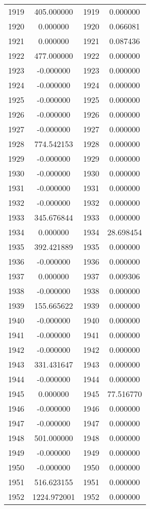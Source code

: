 \documentclass[12pt]{article}
\begin{document}
\begin{longtable}{@{}cccc@{}}
1919 & 405.000000 & 1919 & 0.000000 \\
1920 & 0.000000 & 1920 & 0.066081 \\
1921 & 0.000000 & 1921 & 0.087436 \\
1922 & 477.000000 & 1922 & 0.000000 \\
1923 & -0.000000 & 1923 & 0.000000 \\
1924 & -0.000000 & 1924 & 0.000000 \\
1925 & -0.000000 & 1925 & 0.000000 \\
1926 & -0.000000 & 1926 & 0.000000 \\
1927 & -0.000000 & 1927 & 0.000000 \\
1928 & 774.542153 & 1928 & 0.000000 \\
1929 & -0.000000 & 1929 & 0.000000 \\
1930 & -0.000000 & 1930 & 0.000000 \\
1931 & -0.000000 & 1931 & 0.000000 \\
1932 & -0.000000 & 1932 & 0.000000 \\
1933 & 345.676844 & 1933 & 0.000000 \\
1934 & 0.000000 & 1934 & 28.698454 \\
1935 & 392.421889 & 1935 & 0.000000 \\
1936 & -0.000000 & 1936 & 0.000000 \\
1937 & 0.000000 & 1937 & 0.009306 \\
1938 & -0.000000 & 1938 & 0.000000 \\
1939 & 155.665622 & 1939 & 0.000000 \\
1940 & -0.000000 & 1940 & 0.000000 \\
1941 & -0.000000 & 1941 & 0.000000 \\
1942 & -0.000000 & 1942 & 0.000000 \\
1943 & 331.431647 & 1943 & 0.000000 \\
1944 & -0.000000 & 1944 & 0.000000 \\
1945 & 0.000000 & 1945 & 77.516770 \\
1946 & -0.000000 & 1946 & 0.000000 \\
1947 & -0.000000 & 1947 & 0.000000 \\
1948 & 501.000000 & 1948 & 0.000000 \\
1949 & -0.000000 & 1949 & 0.000000 \\
1950 & -0.000000 & 1950 & 0.000000 \\
1951 & 516.623155 & 1951 & 0.000000 \\
1952 & 1224.972001 & 1952 & 0.000000 \\

\end{longtable}
\end{document}
